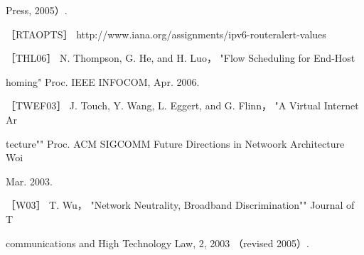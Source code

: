 Press, 2005）.

［RTAOPTS］ http://www.iana.org/assignments/ipv6-routeralert-values

［THL06］ N. Thompson, G. He, and H. Luo， "Flow Scheduling for End-Host

homing" Proc. IEEE INFOCOM, Apr. 2006.

［TWEF03］ J. Touch, Y. Wang, L. Eggert, and G. Flinn， "A Virtual Internet Ar

tecture"" Proc. ACM SIGCOMM Future Directions in Netwoork Architecture Woi

Mar. 2003.

［W03］ T. Wu， "Network Neutrality, Broadband Discrimination"" Journal of T

communications and High Technology Law, 2, 2003 （revised 2005）.


